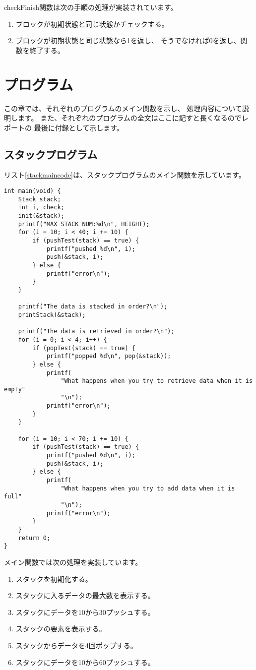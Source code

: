 \documentclass[a4j]{jarticle}
\begin{document}
checkFinish関数は次の手順の処理が実装されています。
\begin{enumerate}
  \item ブロックが初期状態と同じ状態かチェックする。
  \item ブロックが初期状態と同じ状態なら1を返し、
        そうでなければ0を返し、関数を終了する。
\end{enumerate}

\section{プログラム}
この章では、それぞれのプログラムのメイン関数を示し、
処理内容について説明します。
また、それぞれのプログラムの全文はここに記すと長くなるのでレポートの
最後に付録として示します。
\subsection{スタックプログラム}
リスト\ref{stackmaincode}は、スタックプログラムのメイン関数を示しています。
\begin{lstlisting}[caption=スタックのメイン関数,label=stackmaincode]
  int main(void) {
    Stack stack;
    int i, check;
    init(&stack);
    printf("MAX STACK NUM:%d\n", HEIGHT);
    for (i = 10; i < 40; i += 10) {
        if (pushTest(stack) == true) {
            printf("pushed %d\n", i);
            push(&stack, i);
        } else {
            printf("error\n");
        }
    }

    printf("The data is stacked in order?\n");
    printStack(&stack);

    printf("The data is retrieved in order?\n");
    for (i = 0; i < 4; i++) {
        if (popTest(stack) == true) {
            printf("popped %d\n", pop(&stack));
        } else {
            printf(
                "What happens when you try to retrieve data when it is empty"
                "\n");
            printf("error\n");
        }
    }

    for (i = 10; i < 70; i += 10) {
        if (pushTest(stack) == true) {
            printf("pushed %d\n", i);
            push(&stack, i);
        } else {
            printf(
                "What happens when you try to add data when it is full"
                "\n");
            printf("error\n");
        }
    }
    return 0;
}
\end{lstlisting}

メイン関数では次の処理を実装しています。
\begin{enumerate}
  \item スタックを初期化する。
  \item スタックに入るデータの最大数を表示する。
  \item スタックにデータを10から30プッシュする。
  \item スタックの要素を表示する。
  \item スタックからデータを4回ポップする。
  \item スタックにデータを10から60プッシュする。
\end{enumerate}
\end{document}
